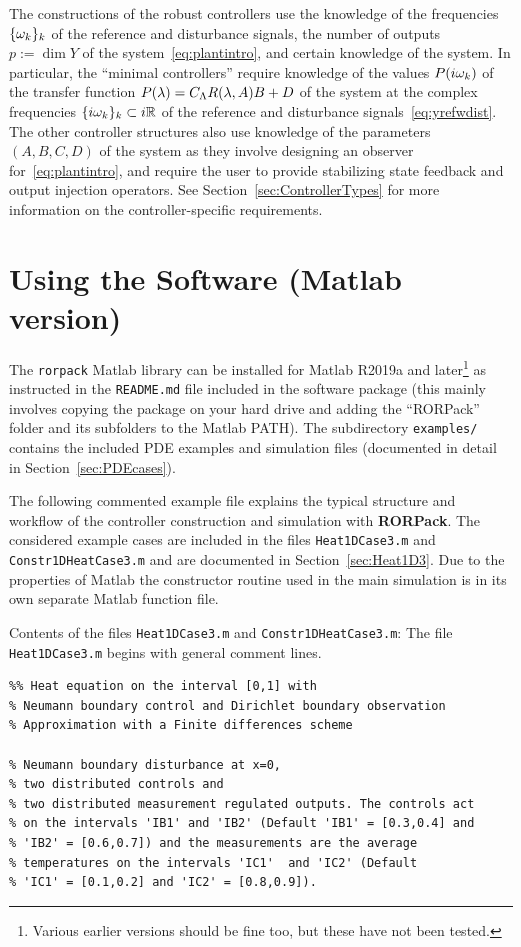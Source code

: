 \documentclass[11pt, a4paper]{amsart}
\newcommand{\CL}{C_\Lambda}
\theoremstyle{definition}
\numberwithin{equation}{section}
\newcommand{\RORname}{\textbf{RORPack}}
\begin{document}
The constructions of the robust controllers use the knowledge of the frequencies $\{\omega_k\}_k $ of the reference and disturbance signals, the number of outputs $p:=\dim Y$ of the system~\eqref{eq:plantintro}, and certain knowledge of the system. In particular, the ``minimal controllers'' require knowledge of the values $P(i\omega_k)$ of the transfer function $P(\gl)=\CL R(\gl,A)B+D$ of the system at the complex frequencies $\{i\omega_k\}_k\subset i{\mathbb{R}}$ of the reference and disturbance signals~\eqref{eq:yrefwdist}.
The other controller structures also use knowledge of the parameters $(A,B,C,D)$ of the system as they involve designing an observer for~\eqref{eq:plantintro}, and require the user to provide stabilizing state feedback and output injection operators. See Section~\ref{sec:ControllerTypes} for more information on the controller-specific requirements.

\section{Using the Software (Matlab version)}

The \texttt{rorpack} Matlab library can be installed for Matlab R2019a and later\footnote{Various earlier versions should be fine too, but these have not been tested.} as instructed in the \texttt{README.md} file included in the software package (this mainly involves copying the package on your hard drive and adding the ``RORPack'' folder and its subfolders to the Matlab PATH). The subdirectory \texttt{examples/} contains the included PDE examples and simulation files (documented in detail in Section~\ref{sec:PDEcases}).

The following commented example file explains the typical structure and workflow of the controller construction and simulation with \RORname. The considered example cases are included in the files \texttt{Heat1DCase3.m} and \texttt{Constr1DHeatCase3.m} and are documented in Section~\ref{sec:Heat1D3}. Due to the properties of Matlab the constructor routine used in the main simulation is in its own separate Matlab function file.

Contents of the files \texttt{Heat1DCase3.m} and \texttt{Constr1DHeatCase3.m}: The file \texttt{Heat1DCase3.m} begins with general comment lines.

\begin{lstlisting}
%% Heat equation on the interval [0,1] with 
% Neumann boundary control and Dirichlet boundary observation 
% Approximation with a Finite differences scheme 

% Neumann boundary disturbance at x=0,
% two distributed controls and
% two distributed measurement regulated outputs. The controls act 
% on the intervals 'IB1' and 'IB2' (Default 'IB1' = [0.3,0.4] and 
% 'IB2' = [0.6,0.7]) and the measurements are the average 
% temperatures on the intervals 'IC1'  and 'IC2' (Default 
% 'IC1' = [0.1,0.2] and 'IC2' = [0.8,0.9]).
\end{lstlisting}
\end{document}

